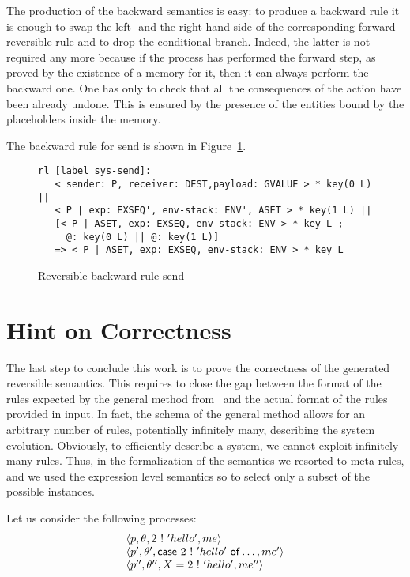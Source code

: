 \documentclass{article}[12pt,a4paper]
\theoremstyle{definition}
\begin{document}
The production of the backward semantics is easy: to produce a
backward rule it is enough to swap the left- and the right-hand side
of the corresponding forward reversible rule and to drop the
conditional branch.  Indeed, the latter is not required any more
because if the process has performed the forward step, as proved by
the existence of a memory for it, then it can always perform the
backward one. One has only to check that all the consequences of the
action have been already undone. This is ensured by the presence of
the entities bound by the placeholders inside the memory.

The backward rule for send is shown in Figure~\ref{fig:revsend}.

\begin{figure}[t]
  \centering
\begin{verbatim}
rl [label sys-send]:
   < sender: P, receiver: DEST,payload: GVALUE > * key(0 L) || 
   < P | exp: EXSEQ', env-stack: ENV', ASET > * key(1 L) || 
   [< P | ASET, exp: EXSEQ, env-stack: ENV > * key L ;
     @: key(0 L) || @: key(1 L)]
   => < P | ASET, exp: EXSEQ, env-stack: ENV > * key L 
\end{verbatim}
  
  \caption{Reversible backward rule send}
  \label{fig:revsend}
\end{figure}

\section{Hint on Correctness}\label{sec:ongoing-work}

The last step to conclude this work is to prove the correctness of the
generated reversible semantics. This requires to close the gap between
the format of the rules expected by the general method from~\cite{LaneseM20} and the actual
format of the rules provided in input. In fact, the schema of the
general method allows for an arbitrary number of rules, potentially
infinitely many, describing the system evolution. Obviously, to
efficiently describe a system, we cannot exploit infinitely many rules.
Thus, in the formalization of the semantics we resorted to meta-rules,
and we used the expression level semantics so to select only a subset
of the possible instances.

Let us consider the following processes:
\[
  \begin{array}{l}
    \langle p, \theta, 2~\mathsf{!}~'hello', me\rangle\\
    \langle p', \theta', \mathsf{case}~2~\mathsf{!}~'hello'~\mathsf{of} \ldots, me'\rangle\\
    \langle p'', \theta'', X = 2~\mathsf{!}~'hello', me''\rangle 
  \end{array}
\]
\end{document}
